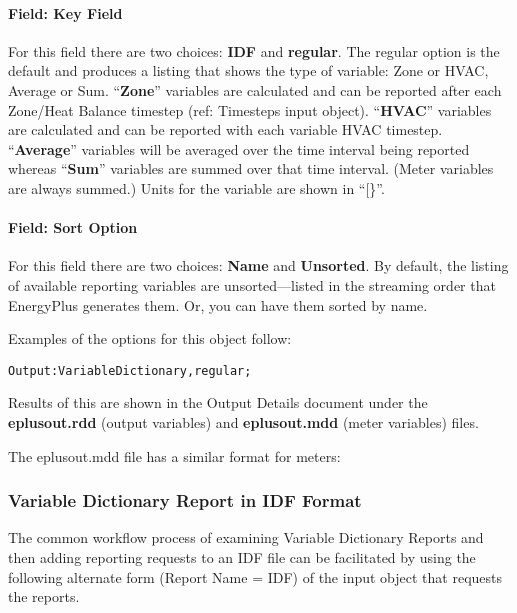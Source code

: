 \paragraph{Field: Key Field}\label{field-key-field}

For this field there are two choices: \textbf{IDF} and \textbf{regular}. The regular option is the default and produces a listing that shows the type of variable: Zone or HVAC, Average or Sum. ``\textbf{Zone}'' variables are calculated and can be reported after each Zone/Heat Balance timestep (ref: Timesteps input object). ``\textbf{HVAC}'' variables are calculated and can be reported with each variable HVAC timestep. ``\textbf{Average}'' variables will be averaged over the time interval being reported whereas ``\textbf{Sum}'' variables are summed over that time interval. (Meter variables are always summed.) Units for the variable are shown in ``{[}\}''.

\paragraph{Field: Sort Option}\label{field-sort-option}

For this field there are two choices: \textbf{Name} and \textbf{Unsorted}. By default, the listing of available reporting variables are unsorted---listed in the streaming order that EnergyPlus generates them. Or, you can have them sorted by name.

Examples of the options for this object follow:

\begin{lstlisting}
Output:VariableDictionary,regular;
\end{lstlisting}

Results of this are shown in the Output Details document under the \textbf{eplusout.rdd} (output variables) and \textbf{eplusout.mdd} (meter variables) files.

The eplusout.mdd file has a similar format for meters:

\subsubsection{Variable Dictionary Report in IDF Format}\label{variable-dictionary-report-in-idf-format}

The common workflow process of examining Variable Dictionary Reports and then adding reporting requests to an IDF file can be facilitated by using the following alternate form (Report Name = IDF) of the input object that requests the reports.

